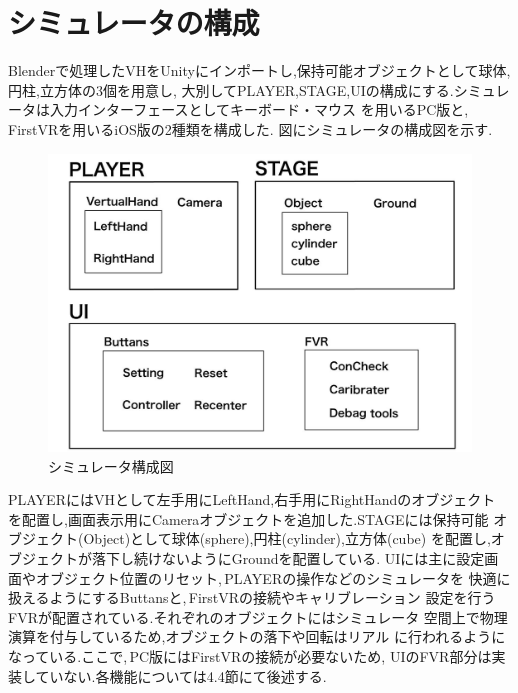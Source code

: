 \documentclass{ltjsreport}
\begin{document}
	\section{シミュレータの構成}
		Blenderで処理したVHをUnityにインポートし,保持可能オブジェクトとして球体,円柱,立方体の3個を用意し,
		大別してPLAYER,STAGE,UIの構成にする.シミュレータは入力インターフェースとしてキーボード・マウス
		を用いるPC版と,\,FirstVRを用いるiOS版の2種類を構成した.
		図にシミュレータの構成図を示す.

		\begin{figure}[H]
		\centering
		\includegraphics[width = 12cm]{../figs/IMG_0384.png}
		\caption{シミュレータ構成図}
		
		\label{fig:simuraterconst}
		\end{figure}
		\vspace{-15pt}
		PLAYERにはVHとして左手用にLeftHand,右手用にRightHandのオブジェクト
		を配置し,画面表示用にCameraオブジェクトを追加した.STAGEには保持可能
		オブジェクト(Object)として球体(sphere),円柱(cylinder),立方体(cube)
		を配置し,オブジェクトが落下し続けないようにGroundを配置している.
		UIには主に設定画面やオブジェクト位置のリセット,\,PLAYERの操作などのシミュレータを
		快適に扱えるようにするButtansと,\,FirstVRの接続やキャリブレーション
		設定を行うFVRが配置されている.それぞれのオブジェクトにはシミュレータ
		空間上で物理演算を付与しているため,オブジェクトの落下や回転はリアル
		に行われるようになっている.ここで,\,PC版にはFirstVRの接続が必要ないため,
		UIのFVR部分は実装していない.各機能については4.4節にて後述する.
\end{document}
